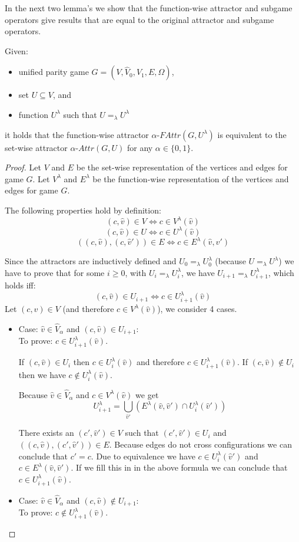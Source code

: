 In the next two lemma's we show that the function-wise attractor and subgame operators give results that are equal to the original attractor and subgame operators.
\begin{lemma}
	\label{lem_attr_equal}
	Given:
	\begin{itemize}
		\item unified parity game $G = ({V},\hat{V}_0,\hat{V}_1, {E}, \hat{\Omega})$,
		\item set ${U} \subseteq {V}$, and
		\item function $U^\lambda$ such that $U =_\lambda U^\lambda$
	\end{itemize}
it holds that the function-wise attractor $\alpha\textit{-FAttr}(G,{U^\lambda})$ is equivalent to the set-wise attractor $\alpha\textit{-Attr}(G,{U})$ for any $\alpha \in \{0,1\}$.
	\begin{proof}
		Let $V$ and $E$ be the set-wise representation of the vertices and edges for game $G$. Let $V^\lambda$ and $E^\lambda$ be the function-wise representation of the vertices and edges for game $G$.
		
		The following properties hold by definition:
		\[ (c,\hat{v}) \in V \iff c \in V^\lambda(\hat{v})\]
		\[ (c,\hat{v}) \in U \iff c \in U^\lambda(\hat{v})\]
		\[ ((c,\hat{v}),(c,\hat{v}')) \in E \iff c \in E^\lambda(\hat{v},\hat{v}') \]
		
		Since the attractors are inductively defined and $U_0 =_\lambda U^\lambda_0$ (because $U =_\lambda U^\lambda$) we have to prove that for some $i \geq 0$, with $U_i =_\lambda U^\lambda_i$,  we have $U_{i+1} =_\lambda U^\lambda_{i+1}$, which holds iff:
		\[ (c,\hat{v}) \in U_{i+1} \iff c \in U^\lambda_{i+1}(\hat{v}) \]
		Let $(c,\hat{v}) \in V$ (and therefore $c \in V^\lambda(\hat{v})$), we consider 4 cases.
		\begin{itemize}
			\item Case: $\hat{v} \in \hat{V}_{\alpha}$ and $(c,\hat{v}) \in U_{i+1}$:\\
			To prove: $c \in U^\lambda_{i+1}(\hat{v})$.
			
			If $(c,\hat{v}) \in U_i$ then $c \in U^\lambda_i(\hat{v})$ and therefore $c \in U^\lambda_{i+1}(\hat{v})$. If $(c,\hat{v}) \notin U_i$ then we have $c \notin U^\lambda_i(\hat{v})$.
			
			
			Because $\hat{v} \in \hat{V}_{\alpha}$ and $c \in V^\lambda(\hat{v})$ we get
			\[ U^\lambda_{i+1} =\bigcup_{\hat{v}'} (E^\lambda(\hat{v},\hat{v}') \cap U^\lambda_i(\hat{v}')) \]
			
			There exists an $(c',\hat{v}') \in V$ such that $(c',\hat{v}') \in U_i$ and $((c,\hat{v}),(c',\hat{v}')) \in E$. Because edges do not cross configurations we can conclude that $c' = c$. Due to equivalence we have $c \in U^\lambda_i(\hat{v}')$ and $c \in E^\lambda(\hat{v},\hat{v}')$. If we fill this in in the above formula we can conclude that $c \in U^\lambda_{i+1}(\hat{v})$.
			\item Case: $\hat{v} \in \hat{V}_{\alpha}$ and $(c,\hat{v}) \notin U_{i+1}$:\\
			To prove: $c \notin U^\lambda_{i+1}(\hat{v})$.
			

\end{itemize}
\end{proof}
\end{lemma}
